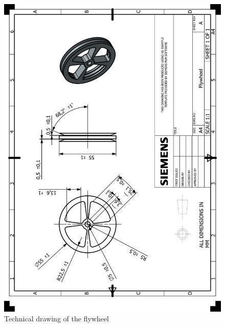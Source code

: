 \documentclass[12pt]{report}
\begin{document}
\begin{appendices}
\begin{figure}[H]
    \centering
    \includegraphics[width=\textwidth]{HP_Flywheel.png} 
    \caption{Technical drawing of the flywheel}
    \label{fig:technical-drawing}
\end{figure}


\end{appendices}
\end{document}
